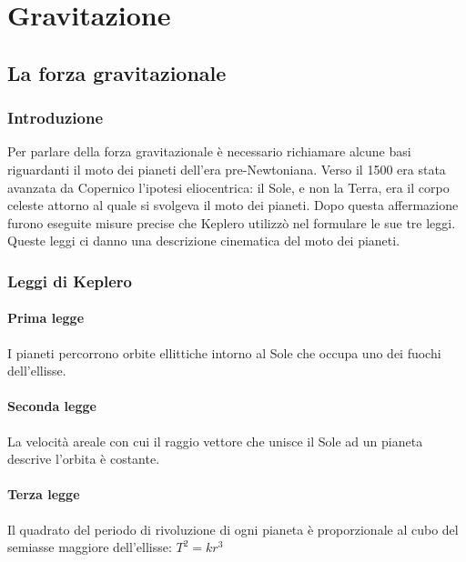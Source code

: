 \documentclass[class=book, crop=false, oneside, 12pt]{standalone}
\begin{document}
\chapter{Gravitazione}

\section{La forza gravitazionale}

\subsection{Introduzione}

Per parlare della forza gravitazionale è necessario richiamare alcune basi riguardanti il moto dei pianeti dell'era pre-Newtoniana.\newline
Verso il 1500 era stata avanzata da Copernico l'ipotesi eliocentrica: il Sole, e non la Terra, era il corpo celeste attorno al quale si svolgeva il moto dei pianeti.\newline
Dopo questa affermazione furono eseguite misure precise che Keplero utilizz\`o nel formulare le sue tre leggi.
Queste leggi ci danno una descrizione cinematica del moto dei pianeti.

\subsection{Leggi di Keplero}
\subsubsection{Prima legge}

I pianeti percorrono orbite ellittiche intorno al Sole che occupa uno dei fuochi dell'ellisse. 

\subsubsection{Seconda legge}

La velocità areale con cui il raggio vettore che unisce il Sole ad un pianeta descrive l'orbita è costante. 

\subsubsection{Terza legge}

Il quadrato del periodo di rivoluzione di ogni pianeta è proporzionale al cubo del semiasse maggiore dell'ellisse: $T^2 = k r^3$
\end{document}
